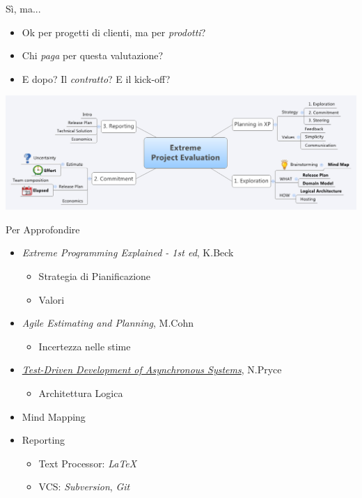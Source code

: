 \documentclass[compress, red, 14pt]{beamer}
\newcommand{\highlight}[1]{{\color{purple} \emph{#1}}}
\begin{document}
	\begin{frame}{Sì, ma...}
		\begin{itemize}
			\item Ok per progetti di clienti, ma per \highlight{prodotti}?
			\item Chi \highlight{paga} per questa valutazione?
			\item E dopo? Il \highlight{contratto}? E il kick-off?
		\end{itemize}
		\begin{center}
			\hspace*{-0.6cm}
			\includegraphics[scale=0.31]{images/takeaway.png}
		\end{center}
	\end{frame}
	
	\begin{frame}{Per Approfondire}
		\begin{itemize}
			\item {\small \highlight{Extreme Programming Explained - 1st ed}, K.Beck}
			\begin{itemize}
				\item Strategia di Pianificazione
				\item Valori
			\end{itemize}
			
			\item {\small \highlight{Agile Estimating and Planning}, M.Cohn}
			\begin{itemize}
				\item Incertezza nelle stime
			\end{itemize}
			
			\item {\footnotesize \highlight{\href{http://www.natpryce.com/articles/000755.html}{Test-Driven Development of Asynchronous Systems}}}{\small , N.Pryce}
				\begin{itemize}
					\item Architettura Logica
				\end{itemize}
		\end{itemize}
		
		\begin{itemize}
			\item Mind Mapping
			\item Reporting
			\begin{itemize}
				\item Text Processor: \highlight{LaTeX}
				\item VCS: \highlight{Subversion}, \highlight{Git}
			\end{itemize}
		\end{itemize}
	\end{frame}
\end{document}
